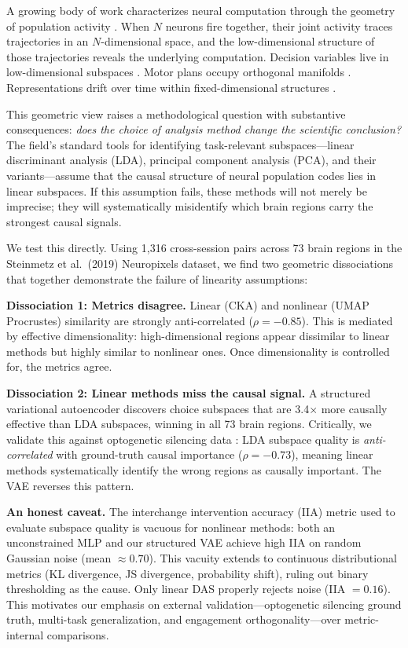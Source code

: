 \documentclass{article}
\begin{document}
A growing body of work characterizes neural computation through the geometry of population activity \citep{cunningham2014dimensionality, gallego2017neural}. When $N$ neurons fire together, their joint activity traces trajectories in an $N$-dimensional space, and the low-dimensional structure of those trajectories reveals the underlying computation. Decision variables live in low-dimensional subspaces \citep{steinmetz2019distributed}. Motor plans occupy orthogonal manifolds \citep{gallego2017neural}. Representations drift over time within fixed-dimensional structures \citep{driscoll2022representational}.

This geometric view raises a methodological question with substantive consequences: \emph{does the choice of analysis method change the scientific conclusion?} The field's standard tools for identifying task-relevant subspaces---linear discriminant analysis (LDA), principal component analysis (PCA), and their variants---assume that the causal structure of neural population codes lies in linear subspaces. If this assumption fails, these methods will not merely be imprecise; they will systematically misidentify which brain regions carry the strongest causal signals.

We test this directly. Using 1,316 cross-session pairs across 73 brain regions in the Steinmetz et al.\ (2019) Neuropixels dataset, we find two geometric dissociations that together demonstrate the failure of linearity assumptions:

\textbf{Dissociation 1: Metrics disagree.} Linear (CKA) and nonlinear (UMAP Procrustes) similarity are strongly anti-correlated ($\rho = -0.85$). This is mediated by effective dimensionality: high-dimensional regions appear dissimilar to linear methods but highly similar to nonlinear ones. Once dimensionality is controlled for, the metrics agree.

\textbf{Dissociation 2: Linear methods miss the causal signal.} A structured variational autoencoder \citep{narayanaswamy2017learning} discovers choice subspaces that are 3.4$\times$ more causally effective than LDA subspaces, winning in all 73 brain regions. Critically, we validate this against optogenetic silencing data \citep{zatkahaas2021spatiotemporal}: LDA subspace quality is \emph{anti-correlated} with ground-truth causal importance ($\rho = -0.73$), meaning linear methods systematically identify the wrong regions as causally important. The VAE reverses this pattern.

\textbf{An honest caveat.} The interchange intervention accuracy (IIA) metric used to evaluate subspace quality is vacuous for nonlinear methods: both an unconstrained MLP and our structured VAE achieve high IIA on random Gaussian noise (mean $\approx 0.70$). This vacuity extends to continuous distributional metrics (KL divergence, JS divergence, probability shift), ruling out binary thresholding as the cause. Only linear DAS properly rejects noise (IIA $= 0.16$). This motivates our emphasis on external validation---optogenetic silencing ground truth, multi-task generalization, and engagement orthogonality---over metric-internal comparisons.
\end{document}
